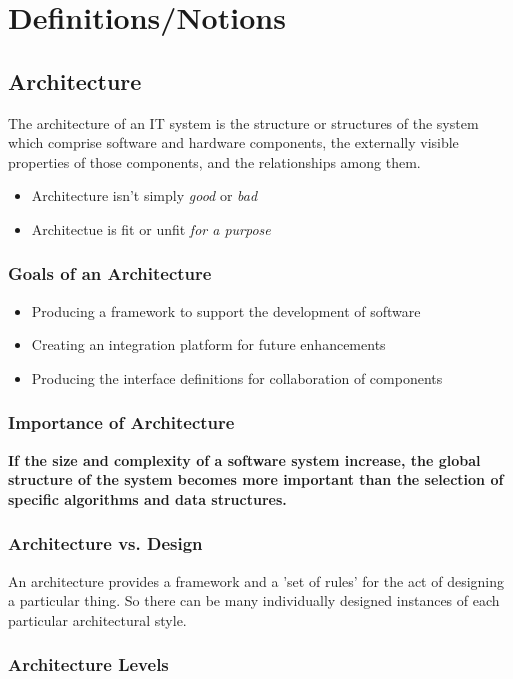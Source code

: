 \chapter{Definitions/Notions}
	\section{Architecture}
		The architecture of an IT system is the structure or structures of the system which comprise
		software and hardware components, the externally visible properties of those components,
		and the relationships among them.
		\begin{itemize}
			\item Architecture isn't simply \textit{good} or \textit{bad}
			\item Architectue is fit or unfit \textit{for a purpose}
		\end{itemize}
		\subsection{Goals of an Architecture}
			\begin{itemize}
				\item Producing a framework to support the development of software
				\item Creating an integration platform for future enhancements
				\item Producing the interface definitions for collaboration of components
			\end{itemize}
		\subsection{Importance of Architecture}
			\color{red}\textbf{If the size and complexity of a software system increase, the global structure of the system becomes more important than the selection of specific algorithms and data structures.}\color{black}
		\subsection{Architecture vs. Design}
		An architecture provides a framework and a 'set of rules' for the act of designing a particular thing. So there can be many individually designed instances of each particular architectural style. 
		\subsection{Architecture Levels}
